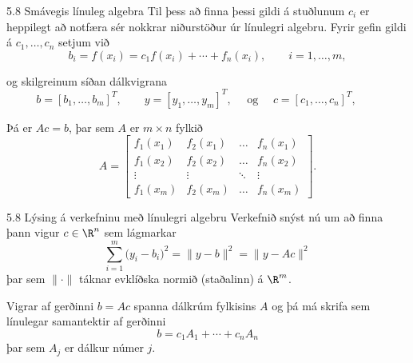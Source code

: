 \begin{frame}{5.8 Smávegis línuleg algebra} 
Til þess að finna þessi gildi á stuðlunum $c_i$ er heppilegt að
notfæra sér nokkrar niðurstöður úr línulegri algebru. Fyrir gefin
gildi á $c_1,\dots,c_n$ setjum við  
\begin{equation*}
	b_i = f(x_i) = c_1f(x_i) + \cdots + f_n(x_i), 
	\qquad i=1,\dots,m,
\end{equation*}

\pause
og skilgreinum síðan dálkvigrana
\begin{equation*}
	b = [b_1,\dots,b_m]^T,\qquad 
	y = [y_1,\dots,y_m]^T,\quad \text{ og } \quad 
	c = [c_1,\dots,c_n]^T,\qquad 
\end{equation*}

\pause
Þá er $Ac=b$, þar sem $A$ er $m\times n$ fylkið
\begin{equation*}
	A = \left[\begin{matrix} 
		f_1(x_1)& f_2(x_1) & \dots & f_n(x_1) \\ 
		f_1(x_2)& f_2(x_2) & \dots & f_n(x_2) \\
		\vdots &\vdots &\ddots &\vdots \\
		f_1(x_m)& f_2(x_m) & \dots & f_n(x_m)
	\end{matrix}\right].
\end{equation*}
\end{frame}

\begin{frame}{5.8 Lýsing á verkefninu með línulegri algebru} 
Verkefnið snýst nú um að finna þann vigur $c\in \R^n$ sem lágmarkar
\begin{equation*}
	\sum_{i=1}^m \big(y_i-b_i\big)^2
	= \| y - b \|^2 = \| y - Ac \|^2
\end{equation*}
þar sem $\|\cdot\|$ táknar evklíðska normið (staðalinn) á $\R^m$.

\pause
\smallskip
Vigrar af gerðinni $b= Ac$ spanna dálkrúm fylkisins 
$A$ og þá má skrifa sem línulegar samantektir af gerðinni
\begin{equation*}
	b = c_1A_1 + \cdots + c_nA_n
\end{equation*}
þar sem $A_j$ er dálkur númer $j$.
\end{frame}

